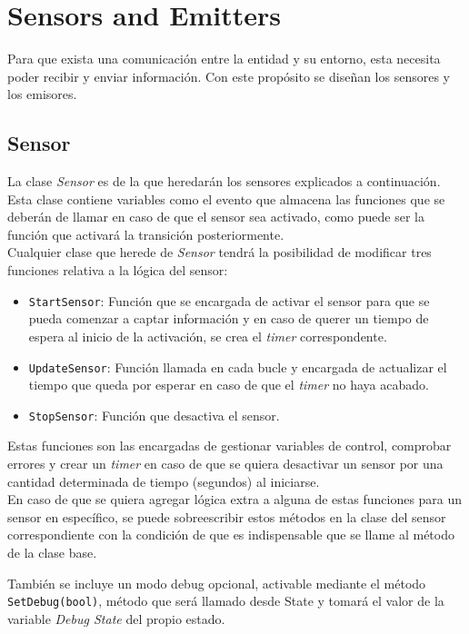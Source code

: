 \section{Sensors and Emitters}

Para que exista una comunicación entre la entidad y su entorno, esta necesita poder recibir y enviar información. Con este propósito se diseñan los sensores y los emisores.\\

\subsection{Sensor}

La clase \textit{Sensor} es de la que heredarán los sensores explicados a continuación. Esta clase contiene variables como el evento que almacena las funciones que se deberán de llamar en caso de que el sensor sea activado, como puede ser la función que activará la transición posteriormente.\\

Cualquier clase que herede de \textit{Sensor} tendrá la posibilidad de modificar tres funciones relativa a la lógica del sensor:

\begin{itemize}
	\item \texttt{StartSensor}: Función que se encargada de activar el sensor para que se pueda comenzar a captar información y en caso de querer un tiempo de espera al inicio de la activación, se crea el \textit{timer} correspondente.
	\item \texttt{UpdateSensor}: Función llamada en cada bucle y encargada de actualizar el tiempo que queda por esperar en caso de que el \textit{timer} no haya acabado.
	\item \texttt{StopSensor}: Función que desactiva el sensor.
\end{itemize}
Estas funciones son las encargadas de gestionar variables de control, comprobar errores y crear un \textit{timer} en caso de que se quiera desactivar un sensor por una cantidad determinada de tiempo (segundos) al iniciarse.\\

En caso de que se quiera agregar lógica extra a alguna de estas funciones para un sensor en específico, se puede sobreescribir estos métodos en la clase del sensor correspondiente con la condición de que es indispensable que se llame al método de la clase base.

También se incluye un modo debug opcional, activable mediante el método \texttt{SetDebug(bool)}, método que será llamado desde State y tomará el valor de la variable \textit{Debug State} del propio estado.\\

